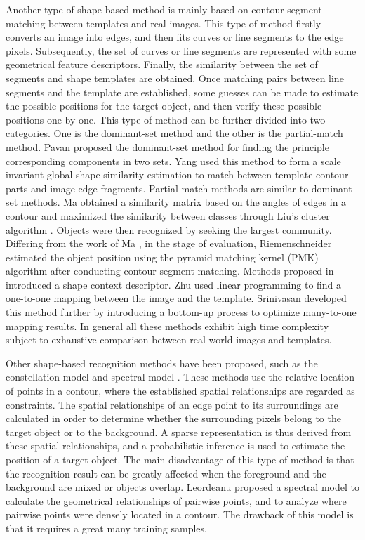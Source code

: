 \documentclass[journal]{IEEEtran}
\begin{document}
Another type of shape-based method is mainly based on contour segment matching between templates and real images. 
This type of method firstly converts an image into edges, 
and then fits curves or line segments to the edge pixels. 
Subsequently, the set of curves or line segments are represented with some geometrical feature descriptors. Finally, the similarity between the set of segments and shape templates are obtained. 
Once matching pairs between line segments and the template are established, 
some guesses can be made to estimate the possible positions for the target object, 
and then verify these possible positions one-by-one. 
This type of method can be further divided into two categories. 
One is the dominant-set method and the other is the partial-match method. 
Pavan \cite{pavan2007} proposed the dominant-set method for finding the principle corresponding components in two sets. 
Yang \cite{yang2012} used this method to form a scale invariant global shape similarity estimation to match between template contour parts and image edge fragments. 
Partial-match methods \cite{ma2011,riemenschneider2010,liu2010} are similar to dominant-set methods. 
Ma \cite{ma2011} obtained a similarity matrix based on the angles of edges in a contour and maximized the similarity between classes through Liu's cluster algorithm \cite{liu2010}. 
Objects were then recognized by seeking the largest community. 
Differing from the work of Ma \cite{ma2011}, 
in the stage of evaluation, Riemenschneider \cite{riemenschneider2010} estimated the object position using the pyramid matching kernel (PMK) algorithm after conducting contour segment matching. 
Methods proposed in \cite{zhu2008,srinivasan2010} introduced a shape context descriptor. 
Zhu \cite{zhu2008} used linear programming to find a one-to-one mapping between the image and the template. 
Srinivasan \cite{srinivasan2010} developed this method further by introducing a bottom-up process to optimize many-to-one mapping results. 
In general all these methods exhibit high time complexity subject to exhaustive comparison between real-world images and templates.

Other shape-based recognition methods have been proposed, 
such as the constellation model \cite{fergus2004} and spectral model \cite{leordeanu2007}.
These methods use the relative location of points in a contour, 
where the established spatial relationships are regarded as constraints. 
The spatial relationships of an edge point to its surroundings are calculated in order to 
determine whether the surrounding pixels belong to the target object or to the background. 
A sparse representation is thus derived from these spatial relationships, 
and a probabilistic inference is used to estimate the position of a target object. 
The main disadvantage of this type of method is that the recognition result can be greatly affected 
when the foreground and the background are mixed or objects overlap. 
Leordeanu \cite{leordeanu2007} proposed a spectral model to calculate the geometrical relationships of pairwise points, 
and to analyze where pairwise points were densely located in a contour. 
The drawback of this model is that it requires a great many training samples.
\end{document}
